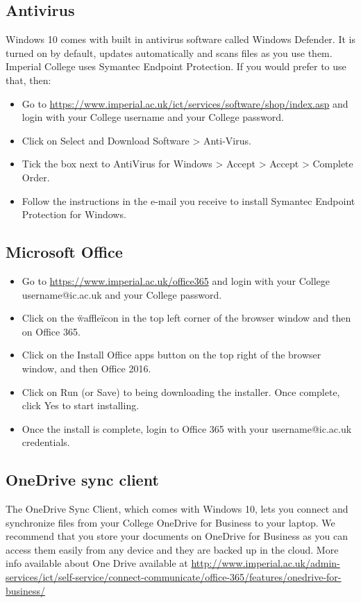 \documentclass[11pt]{article}
\begin{document}
\subsection{Antivirus}
Windows 10 comes with built in antivirus software called Windows Defender. It is turned on by default, updates automatically and scans files as you use them. 
Imperial College uses Symantec Endpoint Protection. If you would prefer to use that, then:
\begin{itemize}
  \item Go to \url{https://www.imperial.ac.uk/ict/services/software/shop/index.asp} and login with your College username and your College password.
  \item Click on Select and Download Software > Anti-Virus.
  \item Tick the box next to AntiVirus for Windows > Accept > Accept > Complete Order.
  \item Follow the instructions in the e-mail you receive to install Symantec Endpoint Protection for Windows. 
\end{itemize}

\subsection{Microsoft Office}
\begin{itemize}
  \item Go to \url{https://www.imperial.ac.uk/office365} and login with your College username@ic.ac.uk and your College password.
  \item Click on the \"waffle\" icon in the top left corner of the browser window and then on Office 365.
  \item Click on the Install Office apps button on the top right of the browser window, and then Office 2016.
  \item Click on Run (or Save) to being downloading the installer. Once complete, click Yes to start installing.
  \item Once the install is complete, login to Office 365 with your username@ic.ac.uk credentials.
\end{itemize}

\subsection{OneDrive sync client}
The OneDrive Sync Client, which comes with Windows 10, lets you connect and synchronize files from your College OneDrive for Business to your laptop. We recommend that you store your documents on OneDrive for Business as you can access them easily from any device and they are backed up in the cloud.
More info available about One Drive available at \url{http://www.imperial.ac.uk/admin-services/ict/self-service/connect-communicate/office-365/features/onedrive-for-business/}
\end{document}
